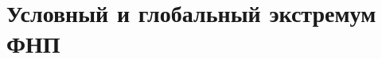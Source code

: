\documentclass[../main.tex]{subfiles}
\begin{document}
 \chapter{Условный и глобальный экстремум ФНП}
 
 
 
\end{document}
